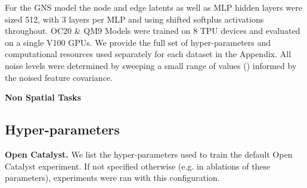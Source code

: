 \documentclass{article} \usepackage{iclr2022_conference,times}
\begin{document}
For the GNS model the node and edge latents as well as MLP hidden layers were sized 512, with 3 layers per MLP and using shifted softplus activations throughout. OC20 \& QM9 Models were trained on 8 TPU devices and evaluated on a single V100 GPUs. We provide the full set of hyper-parameters and computational resources used separately for each dataset in the Appendix. All noise levels were determined by sweeping a small range of values () informed by the noised feature covariance. 


\textbf{Non Spatial Tasks}



\subsection{Hyper-parameters}
\textbf{Open Catalyst.} We list the hyper-parameters used to train the default Open Catalyst experiment. If not specified otherwise (e.g. in ablations of these parameters), experiments were ran with this configuration.
\end{document}
